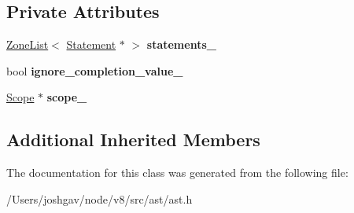 \subsection*{Private Attributes}
\begin{DoxyCompactItemize}
\item 
\hyperlink{classv8_1_1internal_1_1_zone_list}{Zone\+List}$<$ \hyperlink{classv8_1_1internal_1_1_statement}{Statement} $\ast$ $>$ {\bfseries statements\+\_\+}\hypertarget{classv8_1_1internal_1_1_block_ada018ee068104cbe23676cda50f90985}{}\label{classv8_1_1internal_1_1_block_ada018ee068104cbe23676cda50f90985}

\item 
bool {\bfseries ignore\+\_\+completion\+\_\+value\+\_\+}\hypertarget{classv8_1_1internal_1_1_block_af5ba369b2ee3d800e028a2573ed7ae4b}{}\label{classv8_1_1internal_1_1_block_af5ba369b2ee3d800e028a2573ed7ae4b}

\item 
\hyperlink{classv8_1_1internal_1_1_scope}{Scope} $\ast$ {\bfseries scope\+\_\+}\hypertarget{classv8_1_1internal_1_1_block_a6c48c51e99ccc05961e915ec5e83fe7c}{}\label{classv8_1_1internal_1_1_block_a6c48c51e99ccc05961e915ec5e83fe7c}

\end{DoxyCompactItemize}
\subsection*{Additional Inherited Members}


The documentation for this class was generated from the following file\+:\begin{DoxyCompactItemize}
\item 
/\+Users/joshgav/node/v8/src/ast/ast.\+h\end{DoxyCompactItemize}
